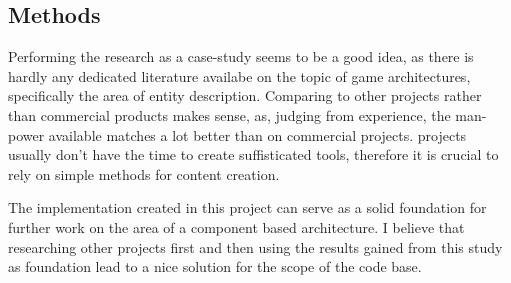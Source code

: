 \subsection{Methods}
Performing the research as a case-study seems to be a good idea, as there is hardly any dedicated literature availabe on
the topic of game architectures, specifically the area of entity description. Comparing \UH{} to other \OS{} projects
rather than commercial products makes sense, as, judging from experience, the man-power available matches a lot better than on commercial
projects. \OS{} projects usually don't have the time to create suffisticated tools, therefore it is crucial to rely on
simple methods for content creation.

The implementation created in this project can serve as a solid foundation for further work on the area of a component
based architecture. I believe that researching other projects first and then using the results gained from this study as
foundation lead to a nice solution for the scope of the \UH{} code base.
